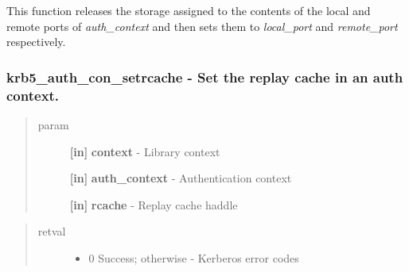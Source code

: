 \documentclass[letterpaper,10pt,english]{sphinxmanual}
\begin{document}
This function releases the storage assigned to the contents of the local and remote ports of \emph{auth\_context} and then sets them to \emph{local\_port} and \emph{remote\_port} respectively.




{\hyperref[appdev/refs/api/krb5_auth_con_genaddrs:c.krb5_auth_con_genaddrs]{}}




\subsubsection{krb5\_auth\_con\_setrcache -  Set the replay cache in an auth context.}
\label{appdev/refs/api/krb5_auth_con_setrcache::doc}\label{appdev/refs/api/krb5_auth_con_setrcache:krb5-auth-con-setrcache-set-the-replay-cache-in-an-auth-context}

\begin{fulllineitems}
\label{appdev/refs/api/krb5_auth_con_setrcache:c.krb5_auth_con_setrcache}
\end{fulllineitems}

\begin{quote}\begin{description}
\item[{param}] \leavevmode
\textbf{{[}in{]}} \textbf{context} - Library context

\textbf{{[}in{]}} \textbf{auth\_context} - Authentication context

\textbf{{[}in{]}} \textbf{rcache} - Replay cache haddle

\end{description}\end{quote}
\begin{quote}\begin{description}
\item[{retval}] \leavevmode\begin{itemize}
\item {} 
0   Success; otherwise - Kerberos error codes

\end{itemize}

\end{description}\end{quote}
\end{document}
